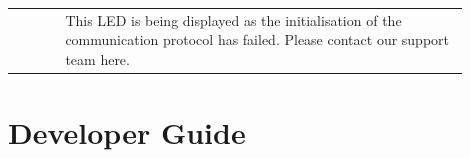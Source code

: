 \begin{tabular}{ m{0.1\linewidth} m{0.8\linewidth} }
				& This LED is being displayed as the initialisation of the communication protocol has failed. Please contact our support team here. \\
				 
			\end{tabular}

	\section{Developer Guide}
	\label{sec:developer_guide}




	






